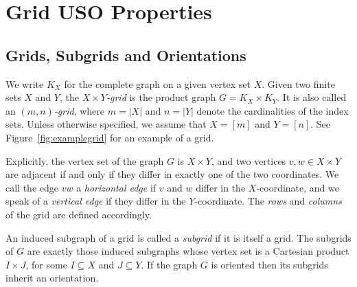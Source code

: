 \documentclass[runningheads,a4paper]{llncs}
\begin{document}
\section{Grid USO Properties}
\label{section:grid_uso_properties}

\subsection{Grids, Subgrids and Orientations}

We write $K_X$ for the complete graph on a given vertex set $X$.
Given two finite sets $X$ and $Y$,
the \emph{$X \times Y$-grid} is the product graph $G = K_X \times K_Y$.
It is also called an \emph{$(m,n)$-grid}, where $m = |X|$ and $n = |Y|$ denote
the cardinalities of the index sets.
Unless otherwise specified, we assume that $X = [m]$ and $Y = [n]$.
See Figure~\ref{fig:examplegrid} for an example of a grid.

Explicitly, the vertex set of the graph $G$ is $X \times Y$, and two
vertices $v,w \in X \times Y$ are adjacent if and only if they differ in
exactly one of the two coordinates.
We call the edge $vw$ a \emph{horizontal edge} if $v$ and $w$ differ in the
$X$-coordinate, and we speak of a \emph{vertical edge} if they differ in the
$Y$-coordinate. The \emph{rows} and \emph{columns} of the grid are defined accordingly.

An induced subgraph of a grid is called a \emph{subgrid} if it is itself a grid.
The subgrids of $G$ are exactly those induced subgraphs whose vertex set is a
Cartesian product $I \times J$, for some $I \subseteq X$ and $J \subseteq Y$.
If the graph $G$ is oriented then its subgrids inherit an orientation.
\end{document}

